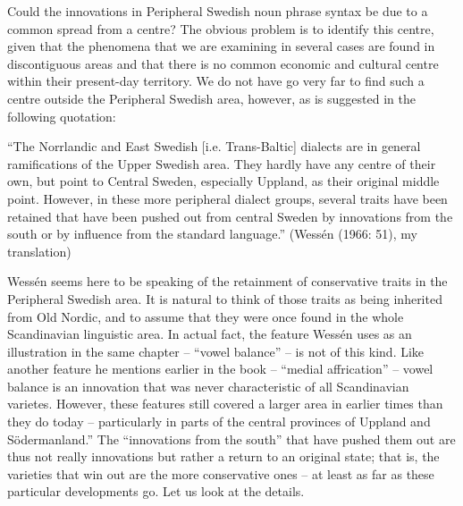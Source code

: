 
Could the innovations in Peripheral Swedish noun phrase syntax be due to a common spread from a centre? The obvious problem is to identify this centre, given that the phenomena that we are examining in several cases are found in discontiguous areas and that there is no common economic and cultural centre within their present-day territory. We do not have go very far to find such a centre outside the Peripheral Swedish area, however, as is suggested in the following quotation: 


“The Norrlandic and East Swedish [i.e. Trans-Baltic] dialects are in general ramifications of the Upper Swedish area. They hardly have any centre of their own, but point to Central Sweden, especially Uppland, as their original middle point. However, in these more peripheral dialect groups, several traits have been retained that have been pushed out from central Sweden by innovations from the south or by influence from the standard language.” (Wessén (1966: 51), my translation)


Wessén seems here to be speaking of the retainment of conservative traits in the Peripheral Swedish area. It is natural to think of those traits as being inherited from Old Nordic, and to assume that they were once found in the whole Scandinavian linguistic area. In actual fact, the feature Wessén uses as an illustration in the same chapter – “vowel balance” – is not of this kind. Like another feature he mentions earlier in the book – “medial affrication” – vowel balance is an innovation that was never characteristic of all Scandinavian varietes.  However, these features still covered a larger area in earlier times than they do today – particularly in parts of the central provinces of Uppland and Södermanland.” The “innovations from the south” that have pushed them out are thus not really innovations but rather a return to an original state; that is, the varieties that win out are the more conservative ones – at least as far as these particular developments go. Let us look at the details.


